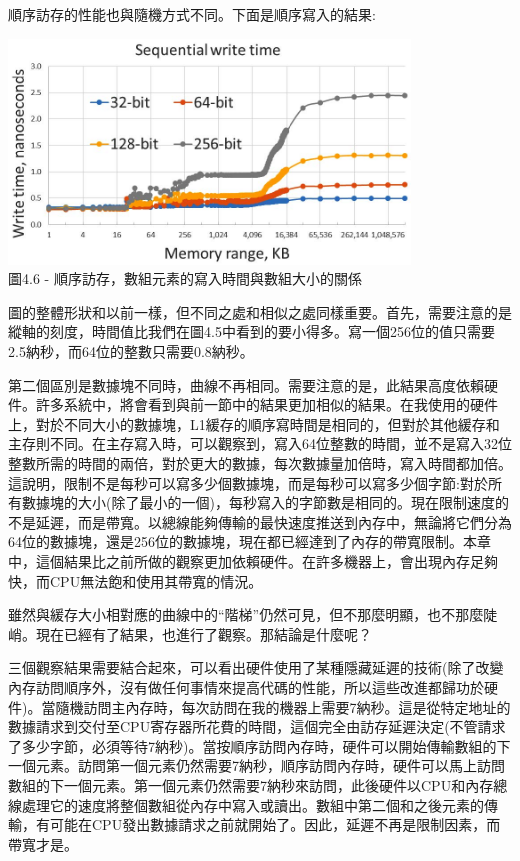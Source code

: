 順序訪存的性能也與隨機方式不同。下面是順序寫入的結果:

\begin{center}
\includegraphics[width=0.8\textwidth]{content/1/chapter4/images/6.jpg}\\
圖4.6 - 順序訪存，數組元素的寫入時間與數組大小的關係
\end{center}

圖的整體形狀和以前一樣，但不同之處和相似之處同樣重要。首先，需要注意的是縱軸的刻度，時間值比我們在圖4.5中看到的要小得多。寫一個256位的值只需要2.5納秒，而64位的整數只需要0.8納秒。

第二個區別是數據塊不同時，曲線不再相同。需要注意的是，此結果高度依賴硬件。許多系統中，將會看到與前一節中的結果更加相似的結果。在我使用的硬件上，對於不同大小的數據塊，L1緩存的順序寫時間是相同的，但對於其他緩存和主存則不同。在主存寫入時，可以觀察到，寫入64位整數的時間，並不是寫入32位整數所需的時間的兩倍，對於更大的數據，每次數據量加倍時，寫入時間都加倍。這說明，限制不是每秒可以寫多少個數據塊，而是每秒可以寫多少個字節:對於所有數據塊的大小(除了最小的一個)，每秒寫入的字節數是相同的。現在限制速度的不是延遲，而是帶寬。以總線能夠傳輸的最快速度推送到內存中，無論將它們分為64位的數據塊，還是256位的數據塊，現在都已經達到了內存的帶寬限制。本章中，這個結果比之前所做的觀察更加依賴硬件。在許多機器上，會出現內存足夠快，而CPU無法飽和使用其帶寬的情況。

雖然與緩存大小相對應的曲線中的“階梯”仍然可見，但不那麼明顯，也不那麼陡峭。現在已經有了結果，也進行了觀察。那結論是什麼呢？


三個觀察結果需要結合起來，可以看出硬件使用了某種隱藏延遲的技術(除了改變內存訪問順序外，沒有做任何事情來提高代碼的性能，所以這些改進都歸功於硬件)。當隨機訪問主內存時，每次訪問在我的機器上需要7納秒。這是從特定地址的數據請求到交付至CPU寄存器所花費的時間，這個完全由訪存延遲決定(不管請求了多少字節，必須等待7納秒)。當按順序訪問內存時，硬件可以開始傳輸數組的下一個元素。訪問第一個元素仍然需要7納秒，順序訪問內存時，硬件可以馬上訪問數組的下一個元素。第一個元素仍然需要7納秒來訪問，此後硬件以CPU和內存總線處理它的速度將整個數組從內存中寫入或讀出。數組中第二個和之後元素的傳輸，有可能在CPU發出數據請求之前就開始了。因此，延遲不再是限制因素，而帶寬才是。

